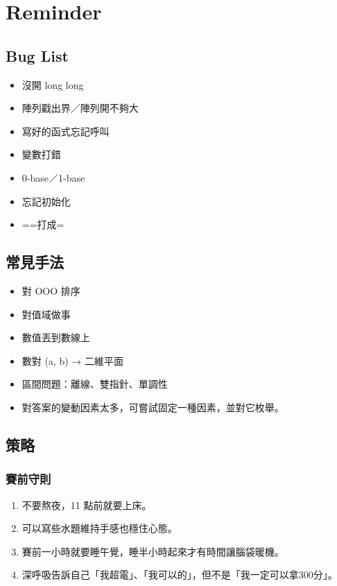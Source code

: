 \documentclass[twocolumn]{article}
\begin{document}
\setlength\parindent{0pt}

\tableofcontents

\pagestyle{fancy}
\fancyfoot{}
\fancyhead[R]{\thepage}

\newpage

\section{Reminder}

\subsection{Bug List}

\begin{itemize}
    \item 沒開 long long
    \item 陣列戳出界／陣列開不夠大
    \item 寫好的函式忘記呼叫
    \item 變數打錯
    \item 0-base／1-base
    \item 忘記初始化
    \item ==打成=
\end{itemize}

\subsection{常見手法}

\begin{itemize}
    \item 對 OOO 排序
    \item 對值域做事
    \item 數值丟到數線上
    \item 數對 (a, b) → 二維平面
    \item 區間問題：離線、雙指針、單調性
    \item 對答案的變動因素太多，可嘗試固定一種因素，並對它枚舉。
\end{itemize}

\subsection{策略}

\subsubsection{賽前守則}
\begin{enumerate}
    \item 不要熬夜，11 點前就要上床。
    \item 可以寫些水題維持手感也穩住心態。
    \item 賽前一小時就要睡午覺，睡半小時起來才有時間讓腦袋暖機。
    \item 深呼吸告訴自己「我超電」、「我可以的」，但不是「我一定可以拿300分」。
\end{enumerate}
\end{document}
